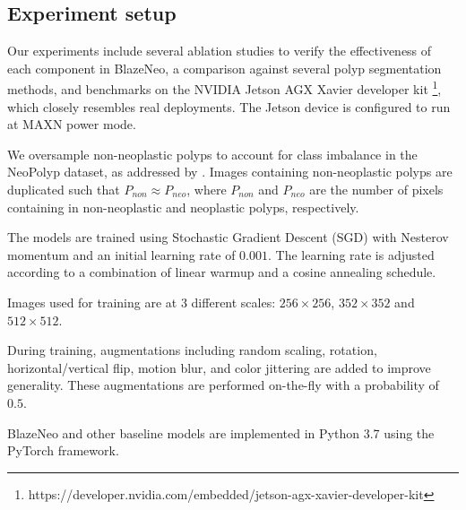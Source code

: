 \documentclass{ieeeaccess}
\newcommand{\ModelName}{BlazeNeo\xspace}
\newcommand{\DatasetName}{NeoPolyp\xspace}
\begin{document}
\subsection{Experiment setup}
\begin{center}
    \begin{figure*}[ht]
        \caption{Dice scores and FPS for different \ModelName variations, with and without auxiliary training. Red triangles denote results with auxiliary training, while blue circles are those without auxiliary training.}
        \label{fig:aux-effectiveness}
    \end{figure*}
\end{center}



Our experiments include several ablation studies to verify the effectiveness of each component in \ModelName, a comparison against several polyp segmentation methods, and benchmarks on the NVIDIA Jetson AGX Xavier developer kit \footnote{https://developer.nvidia.com/embedded/jetson-agx-xavier-developer-kit}, which closely resembles real deployments. The Jetson device is configured to run at MAXN power mode.

We oversample non-neoplastic polyps to account for class imbalance in the \DatasetName dataset, as addressed by \cite{lan2021neounet}. Images containing non-neoplastic polyps are duplicated such that $P_{non} \approx P_{neo}$, where $P_{non}$ and $P_{neo}$ are the number of pixels containing in  non-neoplastic and neoplastic polyps, respectively.

The models are trained using Stochastic Gradient Descent (SGD) with Nesterov momentum and an initial learning rate of $0.001$. The learning rate is adjusted according to a combination of linear warmup and a cosine annealing schedule.

Images used for training are at 3 different scales: $256 \times 256$, $352 \times 352$ and $512 \times 512$.

During training, augmentations including random scaling, rotation, horizontal/vertical flip, motion blur, and color jittering are added to improve generality. These augmentations are performed on-the-fly with a probability of $0.5$.

\ModelName and other baseline models are implemented in Python 3.7 using the PyTorch framework.
\end{document}
